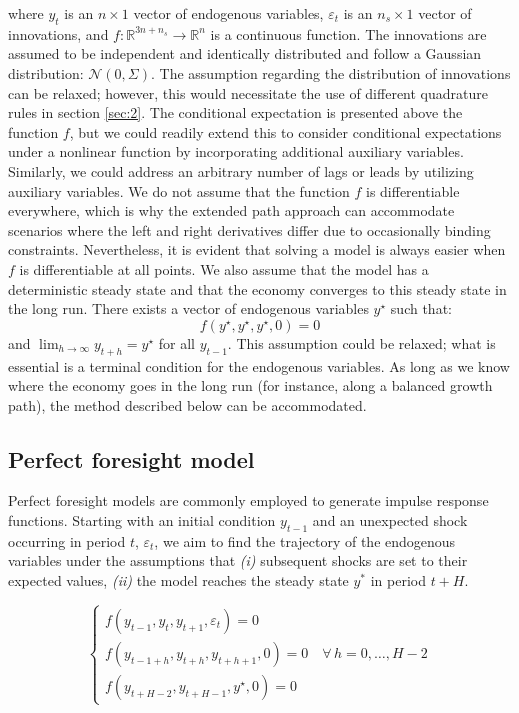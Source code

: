 \documentclass[a4paper,12pt]{amsart}
\begin{document}
where \( y_t \) is an \( n \times 1 \) vector of endogenous
variables, \( \varepsilon_t \) is an \( n_s \times 1 \) vector of
innovations, and \( f: \mathbb R^{3n+n_s} \rightarrow \mathbb R^n \)
is a continuous function. The innovations are assumed to be
independent and identically distributed and follow a Gaussian
distribution: \( \mathcal N(0,\Sigma) \). The assumption regarding the
distribution of innovations can be relaxed; however, this would
necessitate the use of different quadrature rules in section
\ref{sec:2}. The conditional expectation is presented above the
function $f$, but we could readily extend this to consider conditional
expectations under a nonlinear function by incorporating additional
auxiliary variables. Similarly, we could address an arbitrary number
of lags or leads by utilizing auxiliary variables. We do not assume
that the function \(f\) is differentiable everywhere, which is why the
extended path approach can accommodate scenarios where the left and
right derivatives differ due to occasionally binding
constraints. Nevertheless, it is evident that solving a model is
always easier when \(f\) is differentiable at all points. We also
assume that the model has a deterministic steady state and that the
economy converges to this steady state in the long run. There exists a
vector of endogenous variables \(y^{\star}\) such that:
\[
   f\left(y^{\star},y^{\star},y^{\star}, 0\right) = 0
\]
and $\lim_{h\rightarrow\infty}y_{t+h} = y^{\star}$ for all $y_{t-1}$.
This assumption could be relaxed; what is essential is a terminal
condition for the endogenous variables. As long as we know where the
economy goes in the long run (for instance, along a balanced growth
path), the method described below can be accommodated.

\subsection{Perfect foresight model}\label{sec:pf}

Perfect foresight models are commonly employed to generate impulse
response functions. Starting with an initial condition \(y_{t-1}\) and
an unexpected shock occurring in period \(t\), \(\varepsilon_t\), we
aim to find the trajectory of the endogenous variables under the
assumptions that \emph{(i)} subsequent shocks are set to their
expected values, \emph{(ii)} the model reaches the steady
state \(y^*\) in period \(t+H\).

\begin{equation}\label{eq:pf}
   \begin{cases}
      f\left(y_{t-1},y_t,y_{t+1},\varepsilon_t\right) = 0                            \\
      f\left(y_{t-1+h}, y_{t+h}, y_{t+h+1}, 0\right) =0 \quad\forall\, h=0,\dots,H-2 \\
      f\left(y_{t+H-2}, y_{t+H-1}, y^{\star}, 0\right) =0
   \end{cases}
\end{equation}
\end{document}
